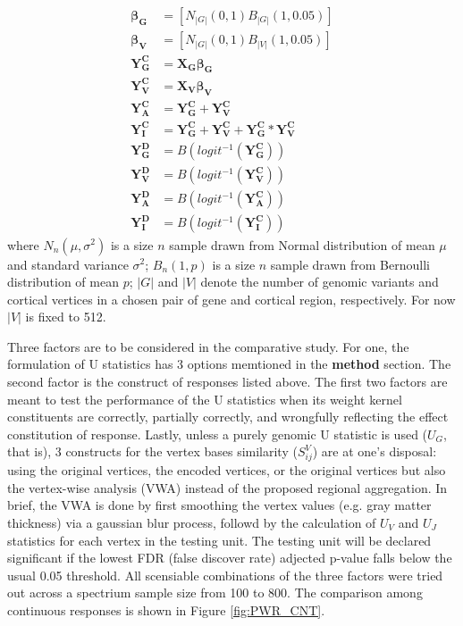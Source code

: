 \begin{equation*} \label{eq:SIM}
\begin{split}
  \boldsymbol{\beta_G} &= [N_{|G|}(0,1) B_{|G|}(1, 0.05)] \\
  \boldsymbol{\beta_V} &= [N_{|G|}(0,1) B_{|V|}(1, 0.05)] \\
  \boldsymbol{Y_G^C}     &= \boldsymbol{X_G \beta_G} \\
  \boldsymbol{Y_V^C}     &= \boldsymbol{X_V \beta_V} \\
  \boldsymbol{Y_A^C}     &= \boldsymbol{Y_G^C} + \boldsymbol{Y_V^C} \\
  \boldsymbol{Y_I^C}     &= \boldsymbol{Y_G^C} + \boldsymbol{Y_V^C} + \boldsymbol{Y_G^C * Y_V^C} \\
  \boldsymbol{Y_G^D}     &= B(logit^{-1}(\boldsymbol{Y_G^C})) \\
  \boldsymbol{Y_V^D}     &= B(logit^{-1}(\boldsymbol{Y_V^C})) \\
  \boldsymbol{Y_A^D}     &= B(logit^{-1}(\boldsymbol{Y_A^C})) \\
  \boldsymbol{Y_I^D}     &= B(logit^{-1}(\boldsymbol{Y_I^C}))
\end{split}
\end{equation*}
where $N_n(\mu, \sigma^2)$ is a size $n$ sample drawn from Normal distribution of mean $\mu$ and standard variance $\sigma^2$; $B_n(1, p)$ is a size $n$ sample drawn from Bernoulli distribution of mean $p$; $|G|$ and $|V|$ denote the number of genomic variants and cortical vertices in a chosen pair of gene and cortical region, respectively. For now $|V|$ is fixed to 512.

Three factors are to be considered in the comparative study. For one, the formulation of U statistics has 3 options memtioned in the \textbf{method} section. The second factor is the construct of responses listed above. The first two factors are meant to test the performance of the U statistics when its weight kernel constituents are correctly, partially correctly, and wrongfully reflecting the effect constitution of response. Lastly, unless a purely genomic U statistic is used ($U_G$, that is), 3 constructs for the vertex bases similarity ($S_{ij}^V$) are at one's disposal: using the original vertices, the encoded vertices, or the original vertices but also the vertex-wise analysis (VWA) instead of the proposed regional aggregation. In brief, the VWA is done by first smoothing the vertex values (e.g. gray matter thickness) via a gaussian blur process, followd by the calculation of $U_V$ and $U_J$ statistics for each vertex in the testing unit. The testing unit will be declared significant if the lowest FDR (false discover rate) adjected p-value falls below the usual 0.05 threshold. All scensiable combinations of the three factors were tried out across a spectrium sample size from 100 to 800. The comparison among continuous responses is shown in Figure \ref{fig:PWR_CNT}.


